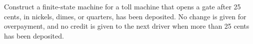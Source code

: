 \documentclass[../main.tex]{subfiles}
\begin{document}
Construct a finite-state machine for a toll machine that opens a gate after 25 cents, in nickels, dimes, or quarters, has been deposited.
No change is given for overpayment, and no credit is given to the next driver when more than 25 cents has been deposited.

\solution
\end{document}
